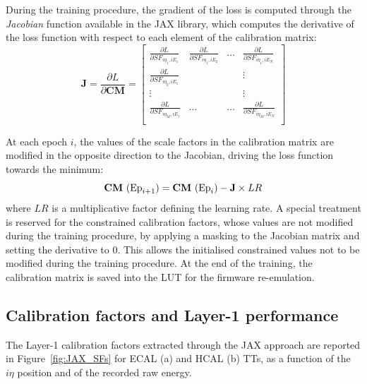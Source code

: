 During the training procedure, the gradient of the loss is computed through the \textit{Jacobian} function available in the JAX library, which computes the derivative of the loss function with respect to each element of the calibration matrix:
\begin{equation}
    \textbf{J} = \frac{\partial L}{\partial \textbf{CM}} = \begin{bmatrix} 
    \frac{\partial L}{\partial SF_{i\eta_1,iE_1}} & \frac{\partial L}{\partial SF_{i\eta_1,iE_2}} & \dots & \frac{\partial L}{\partial SF_{i\eta_1,iE_N}} \\
    \frac{\partial L}{\partial SF_{i\eta_2,iE_1}} & & & \vdots \\
    \vdots & & & \vdots \\
    \frac{\partial L}{\partial SF_{i\eta_M,iE_1}} & \dots & \dots & \frac{\partial L}{\partial SF_{i\eta_M,iE_N}} \\
    \end{bmatrix}
\end{equation}

\bigbreak

At each epoch $i$, the values of the scale factors in the calibration matrix are modified in the opposite direction to the Jacobian, driving the loss function towards the minimum:
\begin{equation}
    \textbf{CM}~(\textnormal{Ep}_{i+1}) = \textbf{CM}~(\textnormal{Ep}_i) - \textbf{J} \times LR 
\end{equation}
where $LR$ is a multiplicative factor defining the learning rate.
A special treatment is reserved for the constrained calibration factors, whose values are not modified during the training procedure, by applying a masking to the Jacobian matrix and setting the derivative to 0. This allows the initialised constrained values not to be modified during the training procedure.
At the end of the training, the calibration matrix is saved into the LUT for the firmware re-emulation.

\subsection{Calibration factors and Layer-1 performance} %

The Layer-1 calibration factors extracted through the JAX approach are reported in Figure~\ref{fig:JAX_SFs} for ECAL (a) and HCAL (b) TTs, as a function of the $i\eta$ position and of the recorded raw energy.

